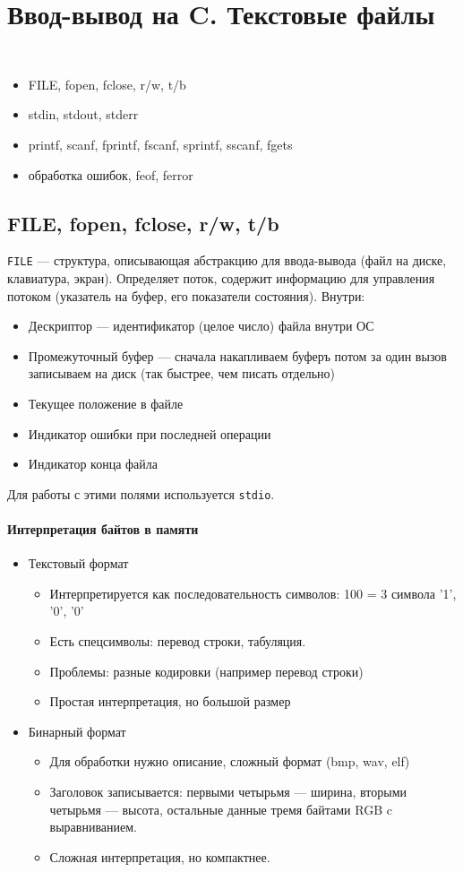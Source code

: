 % 
% 
\section{Ввод-вывод на C. Текстовые файлы}
{\tt
    \begin{itemize}[noitemsep]
	\item FILE, fopen, fclose, r/w, t/b
	\item stdin, stdout, stderr
	\item printf, scanf, fprintf, fscanf, sprintf, sscanf, fgets
	\item {\rm обработка ошибок}, feof, ferror
    \end{itemize}
}
\subsection{FILE, fopen, fclose, r/w, t/b}\label{subsec:quection8_file}
{\tt FILE} --- структура, описывающая абстракцию для ввода-вывода (файл на диске, клавиатура, экран). Определяет поток, содержит информацию для управления потоком (указатель на буфер, его показатели состояния).
Внутри:
\begin{itemize}[noitemsep]
    \item Дескриптор --- идентификатор (целое число) файла внутри ОС
    \item Промежуточный буфер --- сначала накапливаем буферъ потом за один вызов записываем на диск (так быстрее, чем писать отдельно)
    \item Текущее положение в файле
    \item Индикатор ошибки при последней операции
    \item Индикатор конца файла
\end{itemize}
Для работы с этими полями используется {\tt stdio}.
\paragraph{Интерпретация байтов в памяти}
\begin{itemize}[noitemsep]
    \item Текстовый формат
	\begin{itemize}[noitemsep]
	    \item Интерпретируется как последовательность символов:
	100 = 3 символа '1', '0', '0'
	\item Есть спецсимволы: перевод строки, табуляция.
	\item Проблемы: разные кодировки (например перевод строки)
	    \item Простая интерпретация, но большой размер
	\end{itemize}
    \item Бинарный формат
	\begin{itemize}[noitemsep]
	    \item Для обработки нужно описание, сложный формат (bmp, wav, elf)
		\item Заголовок записывается: первыми четырьмя --- ширина, вторыми четырьмя --- высота, остальные данные тремя байтами RGB c выравниванием.
		\item Сложная интерпретация, но компактнее.
	\end{itemize}
\end{itemize}
